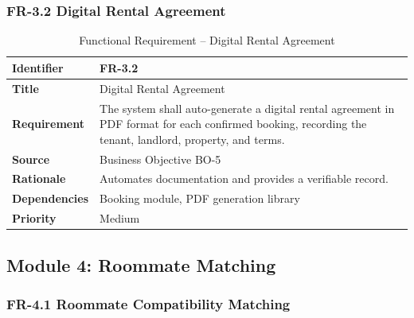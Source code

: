 \subsubsection{FR-3.2 Digital Rental Agreement}

\begin{table}[h]
\centering
\caption{Functional Requirement -- Digital Rental Agreement}

\begin{tabularx}{\textwidth}{|>{\raggedright\arraybackslash}p{3cm}|X|}
\hline
\textbf{Identifier} & FR-3.2 \\
\hline
\textbf{Title} & Digital Rental Agreement \\
\hline
\textbf{Requirement} & The system shall auto-generate a digital rental agreement in PDF format for each confirmed booking, recording the tenant, landlord, property, and terms. \\
\hline
\textbf{Source} & Business Objective BO-5 \\
\hline
\textbf{Rationale} & Automates documentation and provides a verifiable record. \\
\hline
\textbf{Dependencies} & Booking module, PDF generation library \\
\hline
\textbf{Priority} & Medium \\
\hline
\end{tabularx}

\end{table}

\subsection{Module 4: Roommate Matching}

\subsubsection{FR-4.1 Roommate Compatibility Matching}

